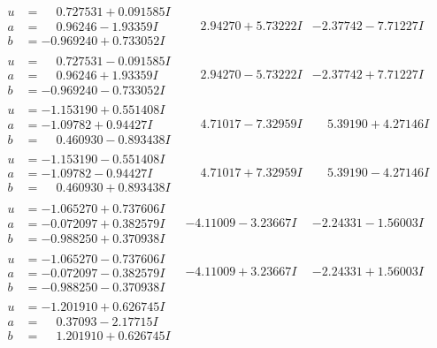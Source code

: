 \documentclass[1p]{elsarticle_modified}
\theoremstyle{definition}
\begin{document}
$$\begin{array}{c|c|c}
\begin{aligned}
u &= \phantom{-}0.727531 + 0.091585 I \\
a &= \phantom{-}0.96246 - 1.93359 I \\
b &= -0.969240 + 0.733052 I\end{aligned}
 & \phantom{-}2.94270 + 5.73222 I & -2.37742 - 7.71227 I \\ \hline\begin{aligned}
u &= \phantom{-}0.727531 - 0.091585 I \\
a &= \phantom{-}0.96246 + 1.93359 I \\
b &= -0.969240 - 0.733052 I\end{aligned}
 & \phantom{-}2.94270 - 5.73222 I & -2.37742 + 7.71227 I \\ \hline\begin{aligned}
u &= -1.153190 + 0.551408 I \\
a &= -1.09782 + 0.94427 I \\
b &= \phantom{-}0.460930 - 0.893438 I\end{aligned}
 & \phantom{-}4.71017 - 7.32959 I & \phantom{-}5.39190 + 4.27146 I \\ \hline\begin{aligned}
u &= -1.153190 - 0.551408 I \\
a &= -1.09782 - 0.94427 I \\
b &= \phantom{-}0.460930 + 0.893438 I\end{aligned}
 & \phantom{-}4.71017 + 7.32959 I & \phantom{-}5.39190 - 4.27146 I \\ \hline\begin{aligned}
u &= -1.065270 + 0.737606 I \\
a &= -0.072097 + 0.382579 I \\
b &= -0.988250 + 0.370938 I\end{aligned}
 & -4.11009 - 3.23667 I & -2.24331 - 1.56003 I \\ \hline\begin{aligned}
u &= -1.065270 - 0.737606 I \\
a &= -0.072097 - 0.382579 I \\
b &= -0.988250 - 0.370938 I\end{aligned}
 & -4.11009 + 3.23667 I & -2.24331 + 1.56003 I \\ \hline\begin{aligned}
u &= -1.201910 + 0.626745 I \\
a &= \phantom{-}0.37093 - 2.17715 I \\
b &= \phantom{-}1.201910 + 0.626745 I\end{aligned}

\end{array}$$
\end{document}
